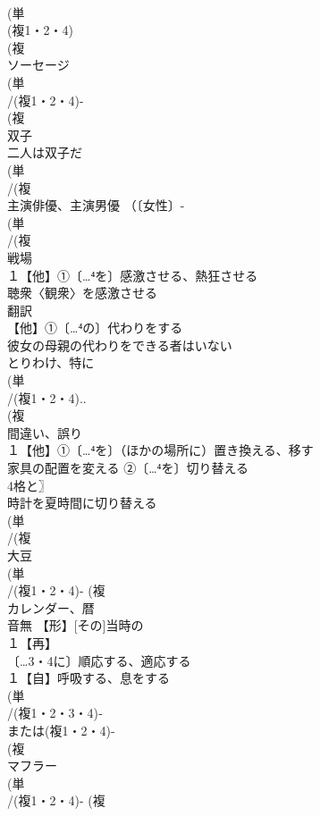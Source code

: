 \documentclass[8pt]{extreport}
\begin{document}
\begin{CJK}{UTF8}{min}
\\	(単
\\	(複1・2・4)
\\	(複
\\	ソーセージ 
\\	(単
\\	/(複1・2・4)-
\\	(複
\\	双子 
\\	二人は双子だ 
\\	(単
\\	/(複
\\	主演俳優、主演男優 （〔女性〕-
\\	(単
\\	/(複
\\	戦場 
\\	１【他】①〔…⁴を〕感激させる、熱狂させる 
\\	聴衆〈観衆〉を感激させる
\\	翻訳 
\\	【他】①〔…⁴の〕代わりをする 
\\	彼女の母親の代わりをできる者はいない
\\	とりわけ、特に
\\	(単
\\	/(複1・2・4)..
\\	(複
\\	間違い、誤り 
\\	１【他】①〔…⁴を〕（ほかの場所に）置き換える、移す 
\\	家具の配置を変える ②〔…⁴を〕切り替える 
\\	4格と〗
\\	時計を夏時間に切り替える
\\	(単
\\	/(複
\\	大豆 
\\	(単
\\	/(複1・2・4)- (複
\\	カレンダー、暦 
\\	音無	【形】[その]当時の
\\	１【再】
\\	〔…3・4に〕順応する、適応する
\\	１【自】呼吸する、息をする 
\\	(単
\\	/(複1・2・3・4)‐
\\	または(複1・2・4)-
\\	(複
\\	マフラー
\\	(単
\\	/(複1・2・4)- (複

\end{CJK}
\end{document}
